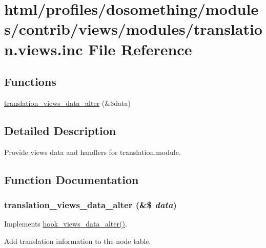 \hypertarget{translation_8views_8inc}{
\section{html/profiles/dosomething/modules/contrib/views/modules/translation.views.inc File Reference}
\label{translation_8views_8inc}
}
\subsection*{Functions}
\begin{DoxyCompactItemize}
\item 
\hyperlink{translation_8views_8inc_af5cdf5632190e288ac0d9518db433711}{translation\_\-views\_\-data\_\-alter} (\&\$data)
\end{DoxyCompactItemize}


\subsection{Detailed Description}
Provide views data and handlers for translation.module. 

\subsection{Function Documentation}
\hypertarget{translation_8views_8inc_af5cdf5632190e288ac0d9518db433711}{
\subsubsection[{translation\_\-views\_\-data\_\-alter}]{\setlength{\rightskip}{0pt plus 5cm}translation\_\-views\_\-data\_\-alter (\&\$ {\em data})}}
\label{translation_8views_8inc_af5cdf5632190e288ac0d9518db433711}
Implements \hyperlink{group__views__hooks_ga6ae0bb0d2385e03c32b57625b6d35826}{hook\_\-views\_\-data\_\-alter()}.

Add translation information to the node table. 